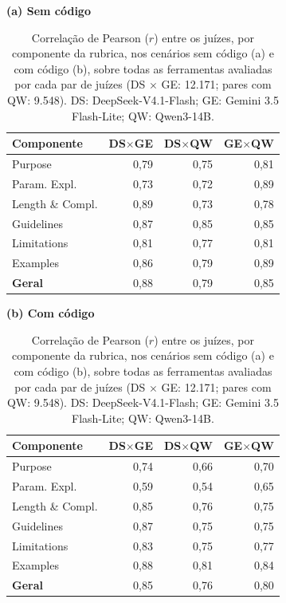 \begin{table}[H]
\centering
\caption{Correlação de Pearson ($r$) entre os juízes, por componente da rubrica, nos cenários sem código (a) e com código (b), sobre todas as ferramentas avaliadas por cada par de juízes (DS $\times$ GE: 12.171; pares com QW: 9.548). DS: DeepSeek-V4.1-Flash; GE: Gemini 3.5 Flash-Lite; QW: Qwen3-14B.}
\label{tab:correlacao-pearson}
\footnotesize
\setlength{\tabcolsep}{2.5pt}
\begin{minipage}[t]{0.49\linewidth}
\centering
\textbf{(a) Sem código}\\[2pt]
\begin{tabular}{lrrr}
\toprule
\textbf{Componente} & \textbf{DS$\times$GE} & \textbf{DS$\times$QW} & \textbf{GE$\times$QW} \\
\midrule
Purpose & 0,79 & 0,75 & 0,81 \\
Param. Expl. & 0,73 & 0,72 & 0,89 \\
Length \& Compl. & 0,89 & 0,73 & 0,78 \\
Guidelines & 0,87 & 0,85 & 0,85 \\
Limitations & 0,81 & 0,77 & 0,81 \\
Examples & 0,86 & 0,79 & 0,89 \\
\midrule
\textbf{Geral} & 0,88 & 0,79 & 0,85 \\
\bottomrule
\end{tabular}
\end{minipage}%
\hfill
\begin{minipage}[t]{0.49\linewidth}
\centering
\textbf{(b) Com código}\\[2pt]
\begin{tabular}{lrrr}
\toprule
\textbf{Componente} & \textbf{DS$\times$GE} & \textbf{DS$\times$QW} & \textbf{GE$\times$QW} \\
\midrule
Purpose & 0,74 & 0,66 & 0,70 \\
Param. Expl. & 0,59 & 0,54 & 0,65 \\
Length \& Compl. & 0,85 & 0,76 & 0,75 \\
Guidelines & 0,87 & 0,75 & 0,75 \\
Limitations & 0,83 & 0,75 & 0,77 \\
Examples & 0,88 & 0,81 & 0,84 \\
\midrule
\textbf{Geral} & 0,85 & 0,76 & 0,80 \\
\bottomrule
\end{tabular}
\end{minipage}
\end{table}
